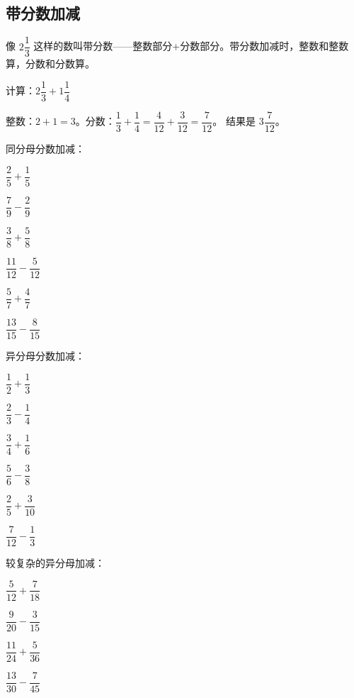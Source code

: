 \subsection*{带分数加减}

像 $2\dfrac{1}{3}$ 这样的数叫带分数——整数部分+分数部分。带分数加减时，整数和整数算，分数和分数算。

\begin{example}
计算：$2\dfrac{1}{3}+1\dfrac{1}{4}$
\end{example}
\begin{solution}
整数：$2+1=3$。分数：$\dfrac{1}{3}+\dfrac{1}{4} = \dfrac{4}{12}+\dfrac{3}{12} = \dfrac{7}{12}$。
结果是 $3\dfrac{7}{12}$。
\end{solution}

\begin{exercise}
\item 同分母分数加减：
  \begin{subexercise}
    \item $\dfrac{2}{5}+\dfrac{1}{5}$
    \item $\dfrac{7}{9}-\dfrac{2}{9}$
    \item $\dfrac{3}{8}+\dfrac{5}{8}$
    \item $\dfrac{11}{12}-\dfrac{5}{12}$
    \item $\dfrac{5}{7}+\dfrac{4}{7}$
    \item $\dfrac{13}{15}-\dfrac{8}{15}$
  \end{subexercise}

\item 异分母分数加减：
  \begin{subexercise}
    \item $\dfrac{1}{2}+\dfrac{1}{3}$
    \item $\dfrac{2}{3}-\dfrac{1}{4}$
    \item $\dfrac{3}{4}+\dfrac{1}{6}$
    \item $\dfrac{5}{6}-\dfrac{3}{8}$
    \item $\dfrac{2}{5}+\dfrac{3}{10}$
    \item $\dfrac{7}{12}-\dfrac{1}{3}$
  \end{subexercise}

\item 较复杂的异分母加减：
  \begin{subexercise}
    \item $\dfrac{5}{12}+\dfrac{7}{18}$
    \item $\dfrac{9}{20}-\dfrac{3}{15}$
    \item $\dfrac{11}{24}+\dfrac{5}{36}$
    \item $\dfrac{13}{30}-\dfrac{7}{45}$
  \end{subexercise}


\end{exercise}
